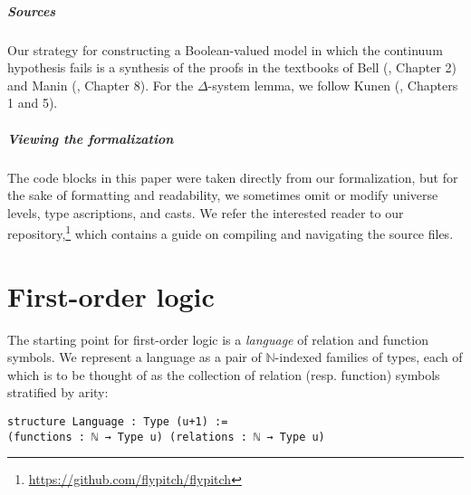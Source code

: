 \documentclass[a4paper,USenglish,cleveref, autoref]{lipics-v2019}
\newcommand{\B}{\mathbb{B}}
\newcommand{\N}{\mathbb{N}}
\theoremstyle{theorem}
\theoremstyle{definition}
\begin{document}
\subparagraph*{Sources} Our strategy for constructing a Boolean-valued model in which the continuum hypothesis fails is a synthesis of the proofs in the textbooks of Bell (\cite{bell2011set}, Chapter 2) and Manin (\cite{manin2009course}, Chapter 8). For the $\Delta$-system lemma, we follow Kunen (\cite{kunen2014set}, Chapters 1 and 5).

\subparagraph*{Viewing the formalization}
The code blocks in this paper were taken directly from our formalization, but for the sake of formatting and readability, we sometimes omit or modify universe levels, type ascriptions, and casts. We refer the interested reader to our repository,\footnote{\url{https://github.com/flypitch/flypitch}} which contains a guide on compiling and navigating the source files.

\section{First-order logic}
\label{sect:fol}
The starting point for first-order logic is a \emph{language} of relation and function symbols. We represent a language as a pair of $\N$-indexed families of types, each of which is to be thought of as the collection of relation (resp. function) symbols stratified by arity:
\begin{lstlisting}
structure Language : Type (u+1) :=
(functions : ℕ → Type u) (relations : ℕ → Type u)
\end{lstlisting}
\end{document}
